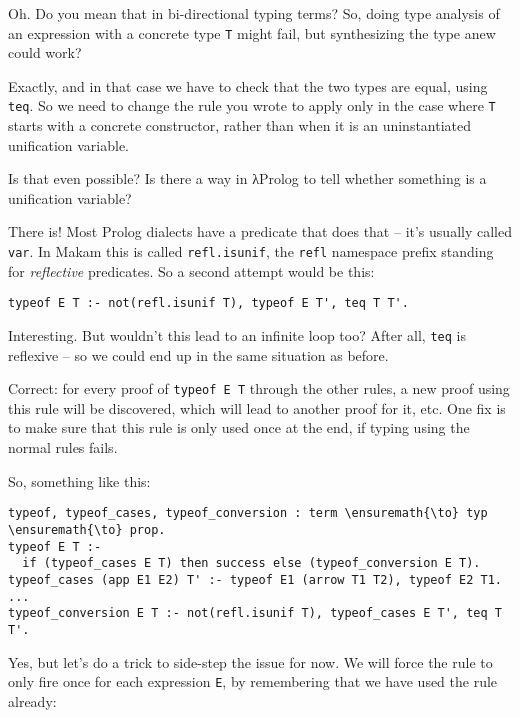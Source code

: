 \heroSTUDENT{} Oh. Do you mean that in bi-directional typing terms? So, doing
type analysis of an expression with a concrete type \texttt{T} might
fail, but synthesizing the type anew could work?

\heroADVISOR{} Exactly, and in that case we have to check that the two types
are equal, using \texttt{teq}. So we need to change the rule you wrote
to apply only in the case where \texttt{T} starts with a concrete
constructor, rather than when it is an uninstantiated unification
variable.

\heroSTUDENT{} Is that even possible? Is there a way in \foreignlanguage{greek}{λ}Prolog to tell
whether something is a unification variable?

\heroADVISOR{} There is! Most Prolog dialects have a predicate that does that
-- it's usually called \texttt{var}. In Makam this is called
\texttt{refl.isunif}, the \texttt{refl} namespace prefix standing for
\emph{reflective} predicates. So a second attempt would be this:

\begin{verbatim}
typeof E T :- not(refl.isunif T), typeof E T', teq T T'.
\end{verbatim}

\heroSTUDENT{} Interesting. But wouldn't this lead to an infinite loop too?
After all, \texttt{teq} is reflexive -- so we could end up in the same
situation as before.

\heroADVISOR{} Correct: for every proof of
\texttt{typeof\ E\ T\textquotesingle{}} through the other rules, a new
proof using this rule will be discovered, which will lead to another
proof for it, etc. One fix is to make sure that this rule is only used
once at the end, if typing using the normal rules fails.

\heroSTUDENT{} So, something like this:

\begin{verbatim}
typeof, typeof_cases, typeof_conversion : term \ensuremath{\to} typ \ensuremath{\to} prop.
typeof E T :-
  if (typeof_cases E T) then success else (typeof_conversion E T).
typeof_cases (app E1 E2) T' :- typeof E1 (arrow T1 T2), typeof E2 T1.
...
typeof_conversion E T :- not(refl.isunif T), typeof_cases E T', teq T T'.
\end{verbatim}

\heroADVISOR{} Yes, but let's do a trick to side-step the issue for now. We
will force the rule to only fire once for each expression \texttt{E}, by
remembering that we have used the rule already:

